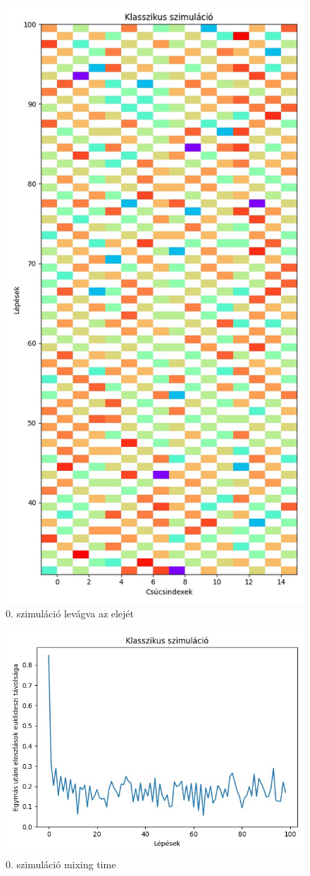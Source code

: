 \documentclass[14pt,a4paper]{article}
\begin{document}
\begin{figure}[H]
\centering
\includegraphics[width = 0.7\columnwidth]{sim_00/counts_short.jpg}
\caption{0. szimuláció levágva az elejét}
\end{figure}
\begin{figure}[H]
\centering
\includegraphics[width = 0.7\columnwidth]{sim_00/mixing_time.jpg}
\caption{0. szimuláció mixing time}
\end{figure}
\end{document}
